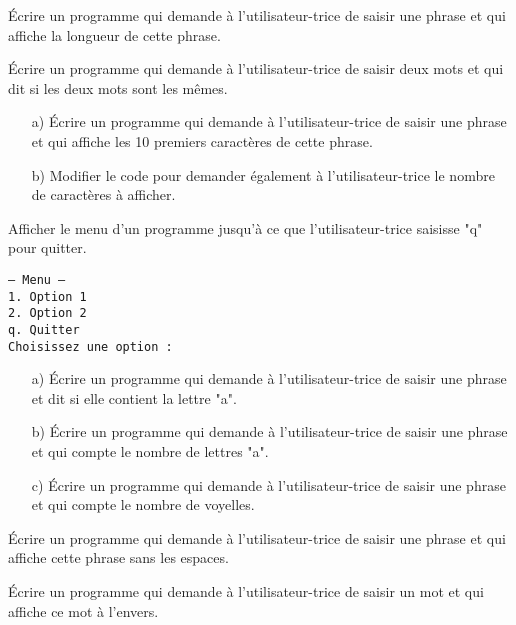 \documentclass[11pt, a4paper]{book}
\begin{document}
\begin{exercice}
Écrire un programme qui demande à l'utilisateur-trice de saisir une phrase et qui affiche la longueur de cette phrase.
\end{exercice}

\begin{exercice}
Écrire un programme qui demande à l'utilisateur-trice de saisir deux mots et qui dit si les deux mots sont les mêmes.
\end{exercice}

\begin{exercice}
\begin{itemize}
\item[a)] Écrire un programme qui demande à l'utilisateur-trice de saisir une phrase et qui affiche les 10 premiers caractères de cette phrase.
\item[b)] Modifier le code pour demander également à l'utilisateur-trice le nombre de caractères à afficher.
\end{itemize}

\end{exercice}

\begin{exercice}
Afficher le menu d'un programme jusqu'à ce que l'utilisateur-trice saisisse "q" pour quitter.

\texttt{--- Menu --- \\
1. Option 1\\
2. Option 2\\
q. Quitter\\
Choisissez une option :}
\end{exercice}

\begin{exercice}
\begin{itemize}
\item[a)] Écrire un programme qui demande à l'utilisateur-trice de saisir une phrase et dit si elle contient la lettre "a".
\item[b)] Écrire un programme qui demande à l'utilisateur-trice de saisir une phrase et qui compte le nombre de lettres "a".
\item[c)] Écrire un programme qui demande à l'utilisateur-trice de saisir une phrase et qui compte le nombre de voyelles.
\end{itemize}

\begin{exercice}
Écrire un programme qui demande à l'utilisateur-trice de saisir une phrase et qui affiche cette phrase sans les espaces.
\end{exercice}

\end{exercice}


\begin{exercice}
Écrire un programme qui demande à l'utilisateur-trice de saisir un mot et qui affiche ce mot à l'envers.
\end{exercice}
\end{document}
